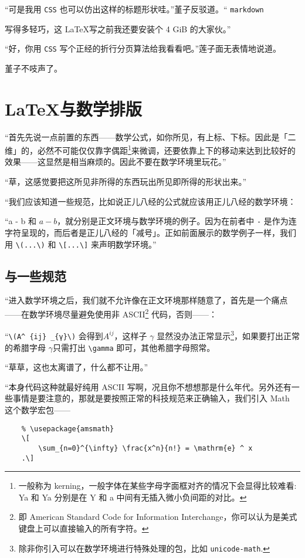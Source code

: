 “可是我用 \verb"CSS" 也可以仿出这样的标题形状哇。”堇子反驳道。“ \verb"markdown"{%
写得多轻巧，这 \LaTeX 写之前我还要安装个 4 GiB 的大家伙。”

“好，你用 \verb"CSS" 写个正经的折行分页算法给我看看吧。”莲子面无表情地说道。

堇子不吱声了。



\section{\LaTeX 与数学排版}

“首先先说一点前置的东西——数学公式，如你所见，有上标、下标。因此是「二维」的，必然不可能仅仅靠字偶距\footnote{一般称为 kerning，一般字体在某些字母字面框对齐的情况下会显得比较难看: {Y}{a} 和 Ya 分别是在 Y 和 a 中间有无插入微小负间距的对比。}来微调，还要依靠上下的移动来达到比较好的效果——这显然是相当麻烦的。因此不要在数学环境里玩花。”

“草，这感觉要把这所见非所得的东西玩出所见即所得的形状出来。”

“我们应该知道一些规范，比如说正儿八经的公式就应该用正儿八经的数学环境：

“a - b 和 \(a - b\)，就分别是正文环境与数学环境的例子。因为在前者中 \verb"-" 是作为连字符呈现的，而后者是正儿八经的「减号」。正如前面展示的数学例子一样，我们用 \verb"\(...\)" 和 \verb"\[...\]" 来声明数学环境。”

\subsection{\AmS 与一些规范}

“进入数学环境之后，我们就不允许像在正文环境那样随意了，首先是一个痛点——在数学环境尽量避免使用非 ASCII\footnote{即
    American Standard Code for Information Interchange，你可以认为是美式键盘上可以直接输入的所有字符。} 代码，否则——：

“\verb"\(A^ {ij} _{γ}\)" 会得到\(
A^{ij} %
\)，这样子 \(\gamma \) 显然没办法正常显示\footnote{除非你引入可以在数学环境进行特殊处理的包，比如 \texttt{unicode-math}.}，如果要打出正常的希腊字母 \(\gamma \)只需打出 \verb"\gamma" 即可，其他希腊字母照常。

“草草，这也太离谱了，什么都不让用。”

“本身代码这种就最好纯用 ASCII 写啊，况且你不想想那是什么年代。另外还有一些事情是要注意的，那就是要按照正常的科技规范来正确输入，我们引入 \AmS{}Math 这个数学宏包——

\begin{codeing}
    \begin{lstlisting}
    % \usepackage{amsmath}
    \[
        \sum_{n=0}^{\infty} \frac{x^n}{n!} = \mathrm{e} ^ x
    .\]
\end{lstlisting}
\end{codeing}

}
